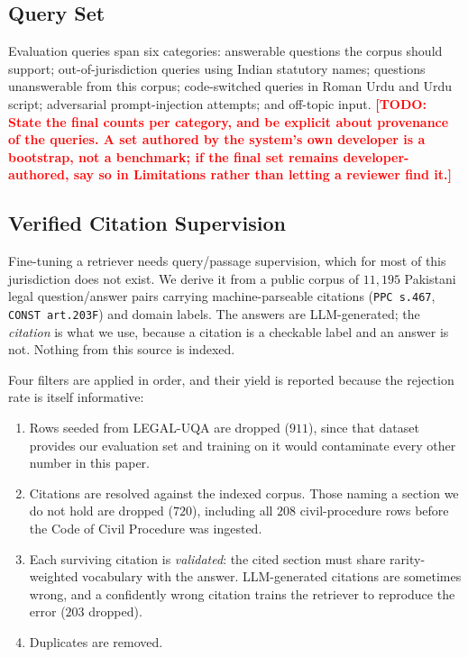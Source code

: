 \documentclass[conference]{IEEEtran}
\newcommand{\TODO}[1]{\textcolor{red}{\textbf{[TODO: #1]}}}
\begin{document}
\subsection{Query Set}
Evaluation queries span six categories: answerable questions the corpus should
support; out-of-jurisdiction queries using Indian statutory names; questions
unanswerable from this corpus; code-switched queries in Roman Urdu and Urdu
script; adversarial prompt-injection attempts; and off-topic input.
\TODO{State the final counts per category, and be explicit about provenance of
the queries. A set authored by the system's own developer is a bootstrap, not a
benchmark; if the final set remains developer-authored, say so in Limitations
rather than letting a reviewer find it.}

\subsection{Verified Citation Supervision}
\label{sec:citationdata}
Fine-tuning a retriever needs query/passage supervision, which for most of this
jurisdiction does not exist. We derive it from a public corpus of $11{,}195$
Pakistani legal question/answer pairs carrying machine-parseable citations
(\texttt{PPC s.467}, \texttt{CONST art.203F}) and domain labels. The answers are
LLM-generated; the \emph{citation} is what we use, because a citation is a
checkable label and an answer is not. Nothing from this source is indexed.

Four filters are applied in order, and their yield is reported because the
rejection rate is itself informative:

\begin{enumerate}
\item Rows seeded from LEGAL-UQA are dropped ($911$), since that dataset
provides our evaluation set and training on it would contaminate every other
number in this paper.
\item Citations are resolved against the indexed corpus. Those naming a section
we do not hold are dropped ($720$), including all $208$ civil-procedure rows
before the Code of Civil Procedure was ingested.
\item Each surviving citation is \emph{validated}: the cited section must share
rarity-weighted vocabulary with the answer. LLM-generated citations are
sometimes wrong, and a confidently wrong citation trains the retriever to
reproduce the error ($203$ dropped).
\item Duplicates are removed.
\end{enumerate}
\end{document}
